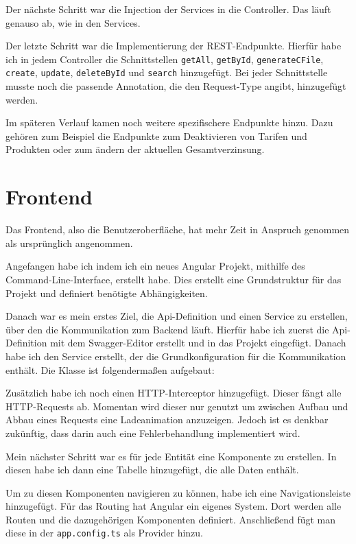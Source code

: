 Der nächste Schritt war die Injection der Services in die Controller. Das läuft genauso ab, wie in den Services.

Der letzte Schritt war die Implementierung der REST-Endpunkte. Hierfür habe ich in jedem Controller die Schnittstellen \texttt{getAll}, \texttt{getById}, \texttt{generateCFile}, \texttt{create}, \texttt{update}, 
\texttt{deleteById} und \texttt{search} hinzugefügt.
Bei jeder Schnittstelle musste noch die passende Annotation, die den Request-Type angibt, hinzugefügt werden.

Im späteren Verlauf kamen noch weitere spezifischere Endpunkte hinzu. Dazu gehören zum Beispiel die Endpunkte zum Deaktivieren von Tarifen und Produkten oder 
zum ändern der aktuellen Gesamtverzinsung.
\section{Frontend}
Das Frontend, also die Benutzeroberfläche, hat mehr Zeit in Anspruch genommen als ursprünglich angenommen.

Angefangen habe ich indem ich ein neues Angular Projekt, mithilfe des Command-Line-Interface, erstellt habe. Dies erstellt eine Grundstruktur für das Projekt und definiert benötigte Abhängigkeiten.

Danach war es mein erstes Ziel, die Api-Definition und einen Service zu erstellen, über den die Kommunikation zum Backend läuft. Hierfür habe ich zuerst die Api-Definition mit dem Swagger-Editor erstellt und in 
das Projekt eingefügt. Danach habe ich den Service erstellt, der die Grundkonfiguration für die Kommunikation enthält.
Die Klasse ist folgendermaßen aufgebaut:


Zusätzlich habe ich noch einen HTTP-Interceptor hinzugefügt. Dieser fängt alle HTTP-Requests ab. Momentan wird dieser nur genutzt um zwischen 
Aufbau und Abbau eines Requests eine Ladeanimation anzuzeigen. Jedoch ist es denkbar zukünftig, dass darin auch eine Fehlerbehandlung implementiert wird.

Mein nächster Schritt war es für jede Entität eine Komponente zu erstellen. In diesen habe ich dann eine Tabelle hinzugefügt, die alle Daten enthält.

Um zu diesen Komponenten navigieren zu können, habe ich eine Navigationsleiste hinzugefügt. Für das Routing hat Angular ein eigenes System. Dort werden alle Routen
und die dazugehörigen Komponenten definiert. Anschließend fügt man diese in der \texttt{app.config.ts} als Provider hinzu.

